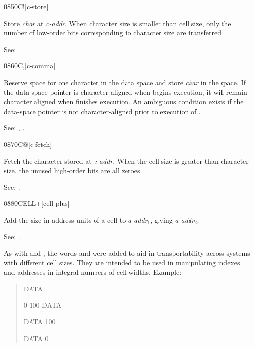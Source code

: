 \begin{newword}{0850}{C!}[c-store]

	Store \emph{char} at \emph{c-addr}. When character size is
	smaller than cell size, only the number of low-order bits
	corresponding to character size are transferred.

\item[See:]
\end{newword}


\begin{newword}{0860}{C,}[c-comma]

	Reserve space for one character in the data space and store
	\emph{char} in the space. If the data-space pointer is
	character aligned when  begins execution, it will
	remain character aligned when  finishes execution.
	An ambiguous condition exists if the data-space pointer is
	not character-aligned prior to execution of .

\item[See:]
	,
	.
\end{newword}


\begin{newword}{0870}{C@}[c-fetch]

	Fetch the character stored at \emph{c-addr}. When the cell
	size is greater than character size, the unused high-order
	bits are all zeroes.

\item[See:]
	.
\end{newword}


\begin{newword}{0880}{CELL+}[cell-plus]

	Add the size in address units of a cell to \emph{a-addr}$_1$,
	giving \emph{a-addr}$_2$.

\item[See:]
	.

	\begin{rationale} %
		As with  and , the words 
		and  were added to aid in transportability across
		systems with different cell sizes. They are intended to be used
		in manipulating indexes and addresses in integral numbers of
		cell-widths. Example:
		\begin{quote}\ttfamily
			 DATA

			0 100 DATA 

			DATA   100

			DATA    0
		\end{quote}
	\end{rationale}
\end{newword}


